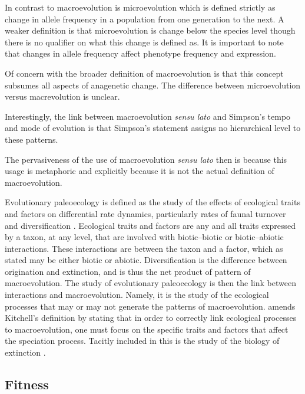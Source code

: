\documentclass[12pt,letterpaper]{article}
\begin{document}
In contrast to macroevolution is microevolution \citep{Simpson1944,Foote2007b} which is defined strictly as change in allele frequency in a population from one generation to the next. A weaker definition is that microevolution is change below the species level \citep{Foote2007b} though there is no qualifier on what this change is defined as. It is important to note that changes in allele frequency affect phenotype frequency and expression.


Of concern with the broader definition of macroevolution is that this concept subsumes all aspects of anagenetic change. The difference between microevolution versus macrevolution is unclear.

Interestingly, the link between macroevolution \textit{sensu lato} and Simpson's tempo and mode of evolution is that Simpson's statement assigns no hierarchical level to these patterns.

The pervasiveness of the use of macroevolution \textit{sensu lato} then is because this usage is metaphoric and explicitly because it is not the actual definition of macroevolution.


Evolutionary paleoecology is defined as the study of the effects of ecological traits and factors on differential rate dynamics, particularly rates of faunal turnover and diversification \citep{Kitchell1985a}.
Ecological traits and factors are any and all traits expressed by a taxon, at any level, that are involved with biotic--biotic or biotic--abiotic interactions. These interactions are between the taxon and a factor, which as stated may be either biotic or abiotic.
Diversification is the difference between origination and extinction, and is thus the net product of pattern of macroevolution.
The study of evolutionary paleoecology is then the link between interactions and macroevolution. Namely, it is the study of the ecological processes that may or may not generate the patterns of macroevolution.
\citet{Allmon1994} amends Kitchell's definition by stating that in order to correctly link ecological processes to macroevolution, one must focus on the specific traits and factors that affect the speciation process. Tacitly included in this is the study of the biology of extinction \citep{Kitchell1990}.


\subsection{Fitness}
\end{document}
